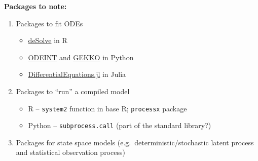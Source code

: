 \documentclass[
]{book}
\providecommand{\tightlist}{%
  \setlength{\itemsep}{0pt}\setlength{\parskip}{0pt}}
\begin{document}
\textbf{Packages to note:}

\begin{enumerate}
\def\labelenumi{\arabic{enumi}.}
\tightlist
\item
  Packages to fit ODEs

  \begin{itemize}
  \tightlist
  \item
    \href{https://cran.r-project.org/web/packages/deSolve/index.html}{deSolve} in R
  \item
    \href{https://docs.scipy.org/doc/scipy/reference/generated/scipy.integrate.odeint.html}{ODEINT} and \href{https://gekko.readthedocs.io/en/latest/}{GEKKO} in Python
  \item
    \href{https://diffeq.sciml.ai/stable/}{DifferentialEquations.jl} in Julia
  \end{itemize}
\item
  Packages to ``run'' a compiled model

  \begin{itemize}
  \tightlist
  \item
    R -- \texttt{system2} function in base R; \texttt{processx} package
  \item
    Python -- \texttt{subprocess.call} (part of the standard library?)
  \end{itemize}
\item
  Packages for state space models (e.g.~deterministic/stochastic latent process and statistical observation process)


\end{enumerate}
\end{document}
